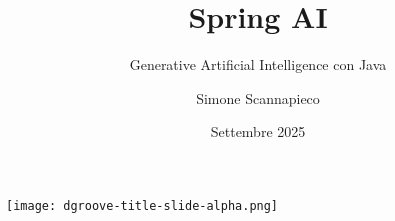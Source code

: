 \title[Spring AI base]{Spring AI}

\subtitle{Generative Artificial Intelligence con Java}


\date{Settembre 2025}

\author[S.Scannapieco]{Simone Scannapieco}

%
\begin{frame}
	\centering
	\texttt{[image: dgroove-title-slide-alpha.png]}
\end{frame}
%
\begin{frame}[fragile]
	
	\titlepage

\end{frame}
